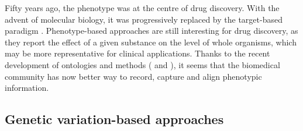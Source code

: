 Fifty years ago, the phenotype was at the centre of drug discovery. With the advent of molecular biology, it was progressively replaced by the target-based paradigm \cite{duran2012recycling}. Phenotype-based approaches are still interesting for drug discovery, as they report the effect of a given substance on the level of whole organisms, which may be more representative for clinical applications. Thanks to the recent development of ontologies and methods (\cite{hoehndorf2011phenomenet} and \cite{hoehndorf2007representing}), it seems that the biomedical community has now better way to record, capture and align phenotypic information.

\subsection{Genetic variation-based approaches}

